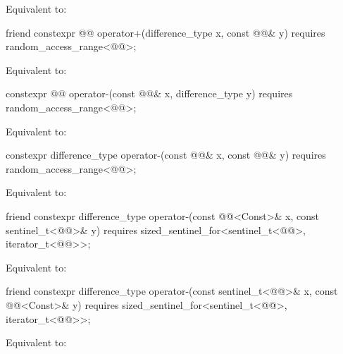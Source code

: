 \begin{itemdescr}
\pnum
\effects
Equivalent to: 
\end{itemdescr}

%
\begin{itemdecl}
friend constexpr @@ operator+(difference_type x, const @@& y)
  requires random_access_range<@@>;
\end{itemdecl}

\begin{itemdescr}
\pnum
\effects
Equivalent to: 
\end{itemdescr}

%
\begin{itemdecl}
constexpr @@ operator-(const @@& x, difference_type y)
  requires random_access_range<@@>;
\end{itemdecl}

\begin{itemdescr}
\pnum
\effects
Equivalent to: 
\end{itemdescr}

%
\begin{itemdecl}
constexpr difference_type operator-(const @@& x, const @@& y)
  requires random_access_range<@@>;
\end{itemdecl}

\begin{itemdescr}
\pnum
\effects
Equivalent to: 
\end{itemdescr}

%
\begin{itemdecl}
friend constexpr difference_type
  operator-(const @@<Const>& x, const sentinel_t<@@>& y)
    requires sized_sentinel_for<sentinel_t<@@>, iterator_t<@@>>;
\end{itemdecl}

\begin{itemdescr}
\pnum
\effects
Equivalent to: 
\end{itemdescr}

%
\begin{itemdecl}
friend constexpr difference_type
  operator-(const sentinel_t<@@>& x, const @@<Const>& y)
    requires sized_sentinel_for<sentinel_t<@@>, iterator_t<@@>>;
\end{itemdecl}

\begin{itemdescr}
\pnum
\effects
Equivalent to: 
\end{itemdescr}

